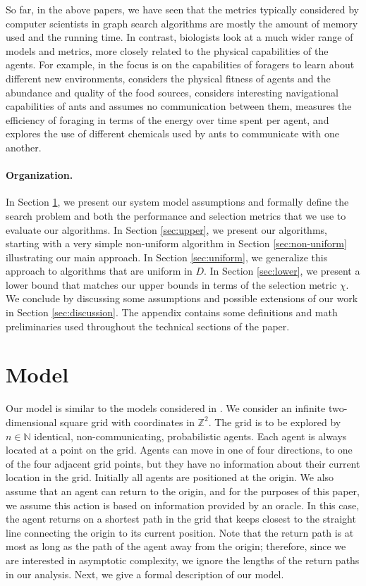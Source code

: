 \documentclass[11pt]{article}
\newcommand{\N}{\mathbb{N}}
\newcommand{\Z}{\mathbb{Z}}
\begin{document}
 So far, in the above papers, we have seen that the metrics typically considered by computer scientists in graph search algorithms are mostly the amount of memory used and the running time. In contrast, biologists look at a much wider range of models and metrics, more closely related to the physical capabilities of the agents. For example, in \cite{arbilly10} the focus is on the capabilities of foragers to learn about different new environments, \cite{giraldeau00} considers the physical fitness of agents and the abundance and quality of the food sources, \cite{harkness85} considers interesting navigational capabilities of ants and assumes no communication between them, \cite{holder87} measures the efficiency of foraging in terms of the energy over time spent per agent, and \cite{robinson05} explores the use of different chemicals used by ants to communicate with one another.

\paragraph{Organization.}

In Section \ref{sec:model}, we present our system model assumptions and formally define the search problem and both the performance and selection metrics that we use to evaluate our algorithms. In Section \ref{sec:upper}, we present our algorithms, starting with a very simple non-uniform algorithm in Section \ref{sec:non-uniform} illustrating our main approach. In Section \ref{sec:uniform}, we generalize this approach to algorithms that are uniform in $D$. In Section \ref{sec:lower}, we present a lower bound that matches our upper bounds in terms of the selection metric $\chi$. We conclude by discussing some assumptions and possible extensions of our work in Section \ref{sec:discussion}. The appendix contains some definitions and math preliminaries used throughout the technical sections of the paper.

\section{Model}
\label{sec:model}

Our model is similar to the models considered in \cite{feinerman12disc, feinerman12podc}. We consider an infinite two-dimensional square grid with coordinates in $\Z^2$. The grid is to be explored by $n\in \N$ identical, non-communicating, probabilistic agents. Each agent is always located at a point on the grid. Agents can move in one of four directions, to one of the four adjacent grid points, but they have no information about their current location in the grid. Initially all agents are positioned at the origin. We also assume that an agent can return to the origin, and for the purposes of this paper, we assume this action is based on information provided by an oracle. In this case, the agent returns on a shortest path in the grid that keeps closest to the straight line connecting the origin to its current position. Note that the return path is at most as long as the path of the agent away from the origin; therefore, since we are interested in asymptotic complexity, we ignore the lengths of the return paths in our analysis. Next, we give a formal description of our model.
\end{document}
